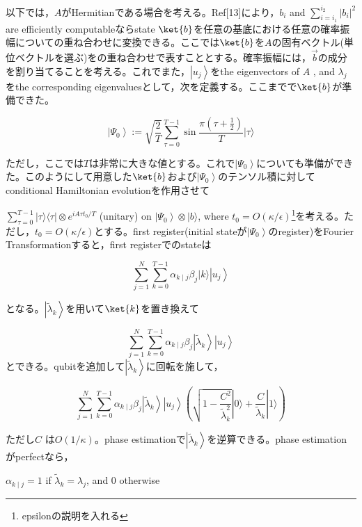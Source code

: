 \documentclass[b5paper,papersize,dvipdfmx,fleqn]{jsarticle}
\begin{document}
以下では，$A$がHermitianである場合を考える。Ref[13]により，$b_{i}$ and $\sum_{i=i_{1}}^{i_{2}}\left|b_{i}\right|^{2}$ are efficiently computableならstate $\ket{b}$を任意の基底における任意の確率振幅についての重ね合わせに変換できる。ここでは$\ket{b}$を$A$の固有ベクトル(単位ベクトルを選ぶ)をの重ね合わせで表すこととする。確率振幅には，$\vec{b}$の成分を割り当てることを考える。これでまた，$\left|u_{j}\right\rangle$をthe eigenvectors of $A$ , and $\lambda_{j}$をthe corresponding eigenvaluesとして，次を定義する。ここまでで$\ket{b}$が準備できた。

$$
\left|\Psi_{0}\right\rangle:=\sqrt{\frac{2}{T}} \sum_{\tau=0}^{T-1} \sin \frac{\pi\left(\tau+\frac{1}{2}\right)}{T}|\tau\rangle
$$

ただし，ここでは$T$は非常に大きな値とする。これで$
\left|\Psi_{0}\right\rangle$についても準備ができた。このようにして用意した$\ket{b}$および$\left|\Psi_{0}\right\rangle$のテンソル積に対してconditional Hamiltonian evolutionを作用させて

$\sum_{\tau=0}^{T-1}|\tau\rangle\langle\tau| \otimes e^{i A \tau t_{0} / T}$ (unitary) on $\left|\Psi_{0}\right\rangle \otimes|b\rangle$, where $t_{0}=O(\kappa / \epsilon)$\footnote{epsilonの説明を入れる}を考える。ただし，$t_{0}=O(\kappa / \epsilon)$とする。first register(initial stateが$\left|\Psi_{0}\right\rangle$のregister)をFourier Transformationすると，first registerでのstateは

$$
\sum_{j=1}^{N} \sum_{k=0}^{T-1} \alpha_{k \mid j} \beta_{j}|k\rangle\left|u_{j}\right\rangle
$$

となる。$\left|\tilde{\lambda}_{k}\right\rangle$を用いて$\ket{k}$を置き換えて

$$
\sum_{j=1}^{N} \sum_{k=0}^{T-1} \alpha_{k \mid j} \beta_{j}\left|\tilde{\lambda}_{k}\right\rangle\left|u_{j}\right\rangle
$$
とできる。qubitを追加して$\left|\tilde{\lambda}_{k}\right\rangle$に回転を施して，

$$
\sum_{j=1}^{N} \sum_{k=0}^{T-1} \alpha_{k \mid j} \beta_{j}\left|\tilde{\lambda}_{k}\right\rangle\left|u_{j}\right\rangle\left(\sqrt{1-\frac{C^{2}}{\tilde{\lambda}_{k}^{2}}}|0\rangle+\frac{C}{\tilde{\lambda}_{k}}|1\rangle\right)
$$

ただし$C$ は$O(1 / \kappa)$。phase estimationで$\left|\tilde{\lambda}_{k}\right\rangle $を逆算できる。phase estimation がperfectなら，

$\alpha_{k \mid j}=1$ if $\tilde{\lambda}_{k}=\lambda_{j}$, and 0 otherwise
\end{document}
